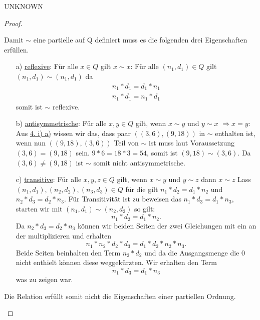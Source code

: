\documentclass{problemset}
\begin{document}
\begin{problem}{UNKNOWN}
\begin{proof}
\begin{enumerate}
              Damit $\sim$ eine partielle auf Q definiert muss es die folgenden drei Eigenschaften erfüllen.
              \begin{enumerate}
                  \item [a)] \underline{reflexive}: Für alle $x \in Q$ gilt $x \sim x$: \newline
                        Für alle $(n_1,d_1) \in Q$ gilt $(n_1, d_1) \sim (n_1, d_1)$ da \begin{align}
                            n_1*d_1 = d_1*n_1 \\
                            n_1*d_1 = n_1*d_1
                        \end{align} somit ist $\sim$ reflexive. \checkmark
                  \item [b)] \underline{antisymmetrische}: Für alle $x, y \in Q$ gilt, wenn $x \sim y$ und $y \sim x$ $\Rightarrow x = y$: \newline
                        Aus \underline{4. i) a)} wissen wir das, dass paar $((3,6),(9,18))$ in $\sim$ enthalten ist, wenn nun $((9,18),(3,6))$ Teil von $\sim$ ist muss laut Voraussetzung $(3,6) = (9,18)$ sein.
                        $9*6 = 18 * 3 = 54$, somit ist $(9,18) \sim (3,6)$.
                        Da $(3,6) \neq (9,18)$ ist $\sim$ somit nicht antisymmetrische.
                  \item [c)] \underline{transitive}: Für alle $x,y,z \in Q$ gilt, wenn $x \sim y$ und $y \sim z$ dann $x \sim z$ \newline
                        Lass $(n_1,d_1), (n_2,d_2), (n_3, d_3) \in Q$ für die gilt $n_1*d_2 = d_1*n_2$ und $n_2*d_3=d_2*n_3$.
                        Für Transitivität ist zu beweisen das $n_1*d_3=d_1*n_3$, starten wir mit $(n_1, d_1) \sim (n_2, d_2)$ so gilt: \[
                            n_1*d_2 = d_1*n_2.
                        \]
                        Da $n_2*d_3=d_2*n_3$ können wir beiden Seiten der zwei
                        Gleichungen mit ein an der multiplizieren und erhalten \[
                            n_1*n_2*d_2*d_3 = d_1*d_2*n_2*n_3.
                        \]
                        Beide Seiten beinhalten den Term $n_2*d_2$ und da die
                        Ausgangsmenge die $0$ nicht enthielt können diese
                        weggekürzten. Wir erhalten den Term \[
                            n_1*d_3 = d_1*n_3
                        \] was zu zeigen war. \checkmark
              \end{enumerate}
              Die Relation erfüllt somit nicht die Eigenschaften einer partiellen Ordnung.

\end{enumerate}
\end{proof}
\end{problem}
\end{document}

